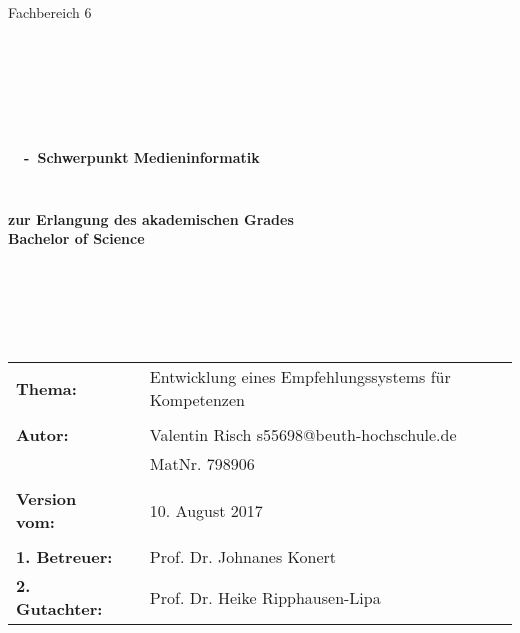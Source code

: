 \begin{center}
\Large{Fachbereich 6}
\end{center}
\begin{verbatim}




\end{verbatim}
\begin{center}
\doublespacing
\textbf{\LARGE{\titleDocument}}\\
\singlespacing
\begin{verbatim}

\end{verbatim}
\textbf{{~\subjectDocument~-~Schwerpunkt Medieninformatik}}
\end{center}
\begin{verbatim}

\end{verbatim}
\begin{center}

\end{center}
\begin{verbatim}

\end{verbatim}
\begin{center}
\textbf{zur Erlangung des akademischen Grades \\ Bachelor of Science}
\end{center}
\begin{verbatim}






\end{verbatim}
\begin{flushleft}
\begin{tabular}{llll}
\textbf{Thema:} & & Entwicklung eines Empfehlungssystems für Kompetenzen & \\
& & \\
\textbf{Autor:} & & Valentin Risch s55698@beuth-hochschule.de& \\
& & MatNr. 798906 & \\
& & \\
\textbf{Version vom:} & & 10. August 2017 &\\
& & \\
\textbf{1. Betreuer:} & & Prof. Dr. Johnanes Konert &\\
\textbf{2. Gutachter:} & & Prof. Dr. Heike Ripphausen-Lipa &\\
\end{tabular}
\end{flushleft}